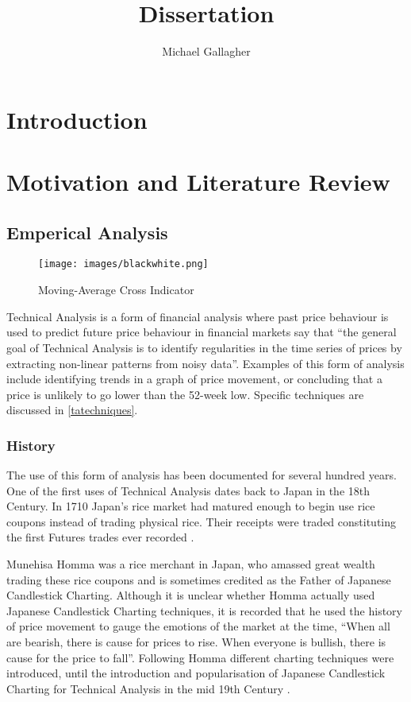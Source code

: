 \documentclass{article}
\title{Dissertation}
\author{Michael Gallagher}
\theoremstyle{definition}
\begin{document}
\maketitle

\tableofcontents

\section{Introduction}

\section{Motivation and Literature Review}

\subsection{Emperical Analysis}

\begin{figure}[H]
    \centering
    \texttt{[image: images/blackwhite.png]}
    \caption{Moving-Average Cross Indicator}
\end{figure}

Technical Analysis is a form of financial analysis where past price behaviour is used to predict future price behaviour in financial markets \cite{foundations} say that ``the general goal of Technical Analysis is to identify regularities in the time series of prices by extracting non-linear patterns from noisy data''. Examples of this form of analysis include identifying trends in a graph of price movement, or concluding that a price is unlikely to go lower than the 52-week low. Specific techniques are discussed in \cref{tatechniques}.

\subsubsection{History}

The use of this form of analysis has been documented for several hundred years. One of the first uses of Technical Analysis dates back to Japan in the 18th Century. In 1710 Japan's rice market had matured enough to begin use rice coupons instead of trading physical rice. Their receipts were traded constituting the first Futures trades ever recorded \citep[p.15]{jcct1991}. 

Munehisa Homma was a rice merchant in Japan, who amassed great wealth trading these rice coupons and is sometimes credited as the Father of Japanese Candlestick Charting. Although it is unclear whether Homma actually used Japanese Candlestick Charting techniques, it is recorded that he used the history of price movement to gauge the emotions of the market at the time, ``When all are bearish, there is cause for prices to rise. When everyone is bullish, there is cause for the price to fall''. Following Homma different charting techniques were introduced, until the introduction and popularisation of Japanese Candlestick Charting for Technical Analysis in the mid 19th Century \citep[p.18]{jcct1994}.
\end{document}
